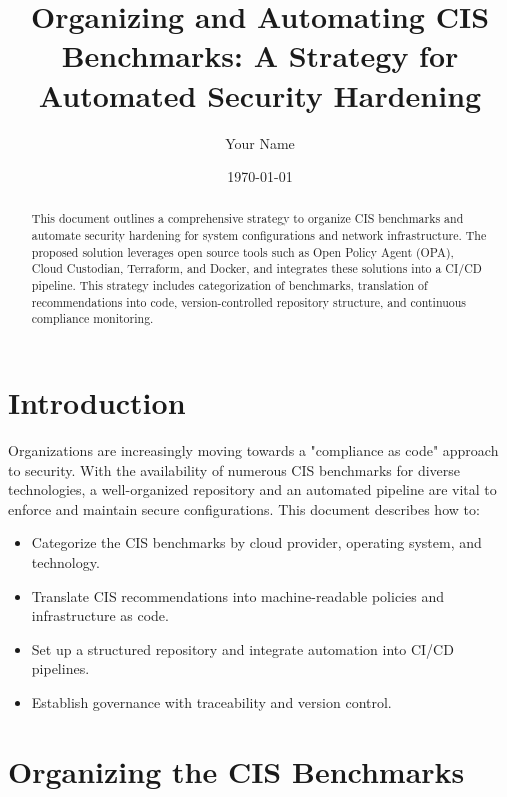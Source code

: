 \documentclass[12pt]{article}
\title{Organizing and Automating CIS Benchmarks: A Strategy for Automated Security Hardening}
\author{Your Name}
\date{\today}
\begin{document}
\maketitle

\begin{abstract}
This document outlines a comprehensive strategy to organize CIS benchmarks and automate security hardening for system configurations and network infrastructure. The proposed solution leverages open source tools such as Open Policy Agent (OPA), Cloud Custodian, Terraform, and Docker, and integrates these solutions into a CI/CD pipeline. This strategy includes categorization of benchmarks, translation of recommendations into code, version-controlled repository structure, and continuous compliance monitoring.
\end{abstract}

\section{Introduction}
Organizations are increasingly moving towards a "compliance as code" approach to security. With the availability of numerous CIS benchmarks for diverse technologies, a well-organized repository and an automated pipeline are vital to enforce and maintain secure configurations. This document describes how to:
\begin{itemize}
    \item Categorize the CIS benchmarks by cloud provider, operating system, and technology.
    \item Translate CIS recommendations into machine-readable policies and infrastructure as code.
    \item Set up a structured repository and integrate automation into CI/CD pipelines.
    \item Establish governance with traceability and version control.
\end{itemize}

\section{Organizing the CIS Benchmarks}
\end{document}
